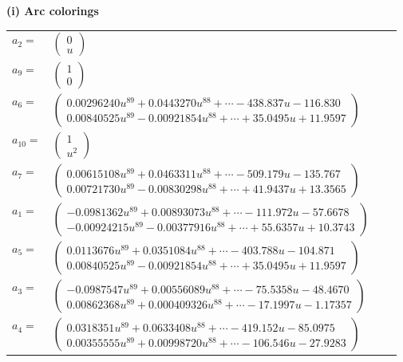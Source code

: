 \documentclass[1p]{elsarticle_modified}
\theoremstyle{definition}
\begin{document}
\flushleft \textbf{(i) Arc colorings}\\
\begin{tabular}{m{7pt} m{180pt} m{7pt} m{180pt} }
\flushright $a_{2}=$&$\begin{pmatrix}0\\u\end{pmatrix}$ \\
\flushright $a_{9}=$&$\begin{pmatrix}1\\0\end{pmatrix}$ \\
\flushright $a_{6}=$&$\begin{pmatrix}0.00296240 u^{89}+0.0443270 u^{88}+\cdots-438.837 u-116.830\\0.00840525 u^{89}-0.00921854 u^{88}+\cdots+35.0495 u+11.9597\end{pmatrix}$ \\
\flushright $a_{10}=$&$\begin{pmatrix}1\\u^2\end{pmatrix}$ \\
\flushright $a_{7}=$&$\begin{pmatrix}0.00615108 u^{89}+0.0463311 u^{88}+\cdots-509.179 u-135.767\\0.00721730 u^{89}-0.00830298 u^{88}+\cdots+41.9437 u+13.3565\end{pmatrix}$ \\
\flushright $a_{1}=$&$\begin{pmatrix}-0.0981362 u^{89}+0.00893073 u^{88}+\cdots-111.972 u-57.6678\\-0.00924215 u^{89}-0.00377916 u^{88}+\cdots+55.6357 u+10.3743\end{pmatrix}$ \\
\flushright $a_{5}=$&$\begin{pmatrix}0.0113676 u^{89}+0.0351084 u^{88}+\cdots-403.788 u-104.871\\0.00840525 u^{89}-0.00921854 u^{88}+\cdots+35.0495 u+11.9597\end{pmatrix}$ \\
\flushright $a_{3}=$&$\begin{pmatrix}-0.0987547 u^{89}+0.00556089 u^{88}+\cdots-75.5358 u-48.4670\\0.00862368 u^{89}+0.000409326 u^{88}+\cdots-17.1997 u-1.17357\end{pmatrix}$ \\
\flushright $a_{4}=$&$\begin{pmatrix}0.0318351 u^{89}+0.0633408 u^{88}+\cdots-419.152 u-85.0975\\0.00355555 u^{89}+0.00998720 u^{88}+\cdots-106.546 u-27.9283\end{pmatrix}$ \\

\end{tabular}
\end{document}
